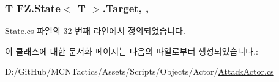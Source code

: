 \subsubsection[{\texorpdfstring{Target}{Target}}]{\setlength{\rightskip}{0pt plus 5cm}T {\bf F\+Z.\+State}$<$ T $>$.Target\hspace{0.3cm}{\ttfamily [get]}, {\ttfamily [protected]}, {\ttfamily [inherited]}}\hypertarget{class_f_z_1_1_state_a6927f5c9f2517052f9dc5596188e9d95}{}\label{class_f_z_1_1_state_a6927f5c9f2517052f9dc5596188e9d95}


State.\+cs 파일의 32 번째 라인에서 정의되었습니다.



이 클래스에 대한 문서화 페이지는 다음의 파일로부터 생성되었습니다.\+:\begin{DoxyCompactItemize}
\item 
D\+:/\+Git\+Hub/\+M\+C\+N\+Tactics/\+Assets/\+Scripts/\+Objects/\+Actor/\hyperlink{_attack_actor_8cs}{Attack\+Actor.\+cs}\end{DoxyCompactItemize}
